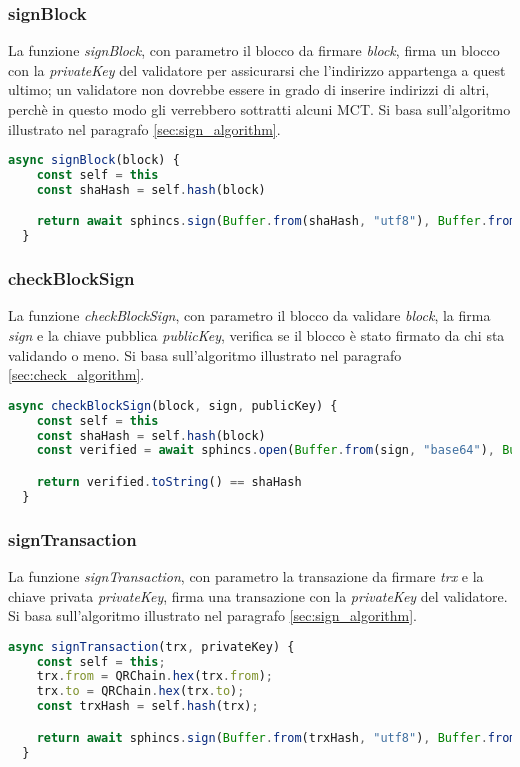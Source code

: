 \subsubsection{signBlock}
La funzione \textit{signBlock}, con parametro il blocco da firmare \textit{block}, firma un blocco con la \textit{privateKey} del validatore per assicurarsi che l'indirizzo appartenga a quest ultimo; un validatore non dovrebbe essere in grado di inserire indirizzi di altri, perchè in questo modo gli verrebbero sottratti alcuni MCT. Si basa sull'algoritmo illustrato nel paragrafo \ref{sec:sign_algorithm}.
\\
\begin{lstlisting}[language=JavaScript,breaklines]
  async signBlock(block) {
    const self = this
    const shaHash = self.hash(block)

    return await sphincs.sign(Buffer.from(shaHash, "utf8"), Buffer.from(self.validator.privateKey, 'hex'))
  }
\end{lstlisting}

\subsubsection{checkBlockSign}
La funzione \textit{checkBlockSign}, con parametro il blocco da validare \textit{block}, la firma \textit{sign} e la chiave pubblica \textit{publicKey}, verifica se il blocco è stato firmato da chi sta validando o meno. Si basa sull'algoritmo illustrato nel paragrafo \ref{sec:check_algorithm}.
\\
\begin{lstlisting}[language=JavaScript,breaklines]
  async checkBlockSign(block, sign, publicKey) {
    const self = this
    const shaHash = self.hash(block)
    const verified = await sphincs.open(Buffer.from(sign, "base64"), Buffer.from(publicKey, 'hex'));

    return verified.toString() == shaHash
  }
\end{lstlisting}

\subsubsection{signTransaction}
La funzione \textit{signTransaction}, con parametro la transazione da firmare \textit{trx} e la chiave privata \textit{privateKey}, firma una transazione con la \textit{privateKey} del validatore. Si basa sull'algoritmo illustrato nel paragrafo \ref{sec:sign_algorithm}.
\\
\begin{lstlisting}[language=JavaScript,breaklines]
  async signTransaction(trx, privateKey) {
    const self = this;
    trx.from = QRChain.hex(trx.from);
    trx.to = QRChain.hex(trx.to);
    const trxHash = self.hash(trx);

    return await sphincs.sign(Buffer.from(trxHash, "utf8"), Buffer.from(privateKey, 'hex'))
  }
\end{lstlisting}


